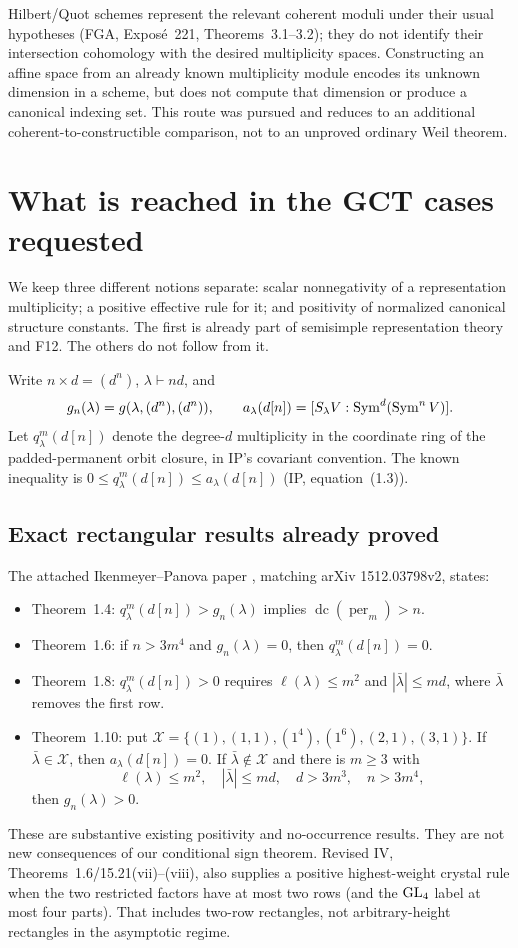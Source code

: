 \documentclass[11pt,a4paper]{article}
\newcommand{\fid}[1]{\textsf{#1}}\newcommand{\gate}[1]{\textsf{#1}}
\theoremstyle{named}\newtheorem{finding}{Finding}[section]
\theoremstyle{definition}\newtheorem{definition}[finding]{Definition}
\theoremstyle{remark}\newtheorem{remark}[finding]{Remark}
\begin{document}
Hilbert/Quot schemes represent the relevant coherent moduli under their usual hypotheses (FGA, Expos\'e~221, Theorems~3.1--3.2); they do not identify their intersection cohomology with the desired multiplicity spaces. Constructing an affine space from an already known multiplicity module encodes its unknown dimension in a scheme, but does not compute that dimension or produce a canonical indexing set. This route was pursued and reduces to an additional coherent-to-constructible comparison, not to an unproved ordinary Weil theorem.

\section{What is reached in the GCT cases requested}\label{sec:rectangles}
We keep three different notions separate: scalar nonnegativity of a representation multiplicity; a positive effective rule for it; and positivity of normalized canonical structure constants. The first is already part of semisimple representation theory and \fid{F12}. The others do not follow from it.

Write $n\times d=(d^n)$, $\lambda\vdash nd$, and
\[
 g_n(\lambda)=g(\lambda,(d^n),(d^n)),\qquad
 a_\lambda(d[n])=[S_\lambda V:\operatorname{Sym}^d(\operatorname{Sym}^nV)].
\]
Let $q^m_\lambda(d[n])$ denote the degree-$d$ multiplicity in the coordinate ring of the padded-permanent orbit closure, in IP's covariant convention. The known inequality is $0\le q^m_\lambda(d[n])\le a_\lambda(d[n])$ (IP, equation~(1.3)).

\subsection{Exact rectangular results already proved}
The attached Ikenmeyer--Panova paper \cite{IP}, matching arXiv 1512.03798v2, states:
\begin{itemize}
\item Theorem~1.4: $q^m_\lambda(d[n])>g_n(\lambda)$ implies $\operatorname{dc}(\operatorname{per}_m)>n$.
\item Theorem~1.6: if $n>3m^4$ and $g_n(\lambda)=0$, then $q^m_\lambda(d[n])=0$.
\item Theorem~1.8: $q^m_\lambda(d[n])>0$ requires $\ell(\lambda)\le m^2$ and $|\bar\lambda|\le md$, where $\bar\lambda$ removes the first row.
\item Theorem~1.10: put
$\mathcal X=\{(1),(1,1),(1^4),(1^6),(2,1),(3,1)\}$.
If $\bar\lambda\in\mathcal X$, then $a_\lambda(d[n])=0$. If $\bar\lambda\notin\mathcal X$ and there is $m\ge3$ with
\[
 \ell(\lambda)\le m^2,\quad |\bar\lambda|\le md,\quad
 d>3m^3,\quad n>3m^4,
\]
then $g_n(\lambda)>0$.
\end{itemize}
These are substantive existing positivity and no-occurrence results. They are not new consequences of our conditional sign theorem. Revised IV, Theorems~1.6/15.21(vii)--(viii), also supplies a positive highest-weight crystal rule when the two restricted factors have at most two rows (and the $\mathrm{GL}_4$ label at most four parts). That includes two-row rectangles, not arbitrary-height rectangles in the asymptotic regime.
\end{document}
